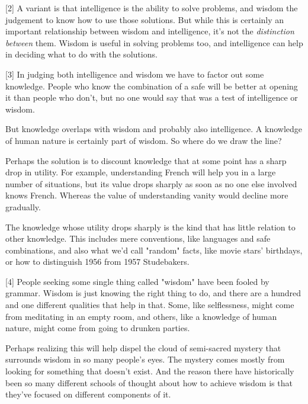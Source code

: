 [2] A variant is that intelligence is the ability to solve
                  problems, and wisdom the judgement to know how to use those
                  solutions. But while this is certainly an important
                  relationship between wisdom and intelligence, it's not the
                  \emph{distinction between} them. Wisdom is useful in solving
                  problems too, and intelligence can help in deciding what to do
                  with the solutions.

[3] In judging both intelligence and wisdom we have to factor
                  out some knowledge. People who know the combination of a safe
                  will be better at opening it than people who don't, but no one
                  would say that was a test of intelligence or wisdom.

But
                  knowledge overlaps with wisdom and probably also intelligence.
                  A knowledge of human nature is certainly part of wisdom. So
                  where do we draw the line?

Perhaps the solution is
                  to discount knowledge that at some point has a sharp drop in
                  utility. For example, understanding French will help you in a
                  large number of situations, but its value drops sharply as
                  soon as no one else involved knows French. Whereas the value
                  of understanding vanity would decline more gradually.

The
                  knowledge whose utility drops sharply is the kind that has
                  little relation to other knowledge. This includes mere
                  conventions, like languages and safe combinations, and also
                  what we'd call "random" facts, like movie stars' birthdays, or
                  how to distinguish 1956 from 1957 Studebakers.

[4] People seeking some single thing called "wisdom" have been
                  fooled by grammar. Wisdom is just knowing the right thing to
                  do, and there are a hundred and one different qualities that
                  help in that. Some, like selflessness, might come from
                  meditating in an empty room, and others, like a knowledge of
                  human nature, might come from going to drunken parties.

Perhaps
                  realizing this will help dispel the cloud of semi-sacred
                  mystery that surrounds wisdom in so many people's eyes. The
                  mystery comes mostly from looking for something that doesn't
                  exist. And the reason there have historically been so many
                  different schools of thought about how to achieve wisdom is
                  that they've focused on different components of it.

